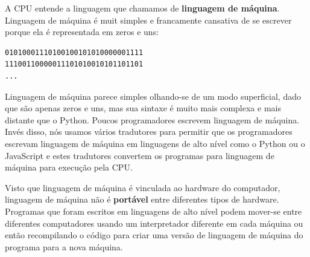 A CPU entende a linguagem que chamamos de {\bf linguagem de máquina}. Linguagem
de máquina é muit simples e francamente cansativa de se escrever porque ela é
representada em zeros e uns:
%

\beforeverb
\begin{verbatim}
01010001110100100101010000001111
11100110000011101010010101101101
...
\end{verbatim}
\afterverb

Linguagem de máquina parece simples olhando-se de um modo superficial,
dado que são apenas zeros e uns, mas sua sintaxe é muito mais complexa
e mais distante que o Python. Poucos programadores escrevem linguagem de
máquina. Invés disso, nós usamos vários tradutores para permitir que os
programadores escrevam linguagem de máquina em linguagens de alto nível
como o Python ou o JavaScript e estes tradutores convertem os programas
para linguagem de máquina para execução pela CPU.
%

Visto que linguagem de máquina é vinculada ao hardware do computador,
linguagem de máquina não é {\bf portável} entre diferentes tipos de hardware.
Programas que foram escritos em linguagens de alto nível podem mover-se
entre diferentes computadores usando um interpretador diferente em cada máquina
ou então recompilando o código para criar uma versão de linguagem de máquina do
programa para a nova máquina.
%

